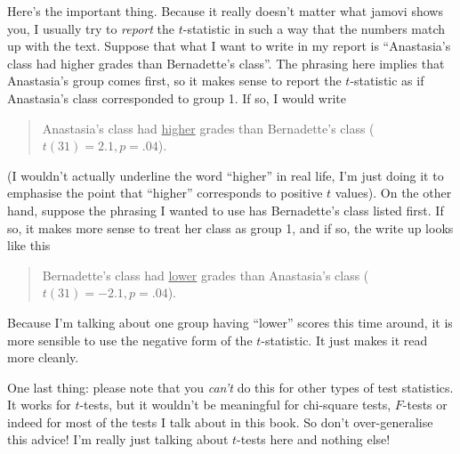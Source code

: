 Here's the important thing. Because it really doesn't matter what jamovi shows you, I usually try to {\it report} the $t$-statistic in such a way that the numbers match up with the text. Suppose that what I want to write in my report is ``Anastasia's class had higher  grades than Bernadette's class''. The phrasing here implies that Anastasia's group comes first, so it makes sense to report the $t$-statistic as if Anastasia's class corresponded to group 1. If so, I would write 
\begin{quote}
Anastasia's class had \underline{higher} grades than Bernadette's class ($t(31)= 2.1, p=.04$). 
\end{quote}
(I wouldn't actually underline the word ``higher'' in real life, I'm just doing it to emphasise the point that ``higher'' corresponds to positive $t$ values). On the other hand, suppose the phrasing I wanted to use has Bernadette's class listed first. If so, it makes more sense to treat her class as group 1, and if so, the write up looks like this
\begin{quote}
Bernadette's class had \underline{lower} grades than Anastasia's class ($t(31)= -2.1, p=.04$). 
\end{quote}
Because I'm talking about one group having ``lower'' scores this time around, it is more sensible to use the negative form of the $t$-statistic. It just makes it read more cleanly.

One last thing: please note that you {\it can't} do this for other types of test statistics. It works for $t$-tests, but it wouldn't be meaningful for chi-square tests, $F$-tests or indeed for most of the tests I talk about in this book. So don't over-generalise this advice! I'm really just talking about $t$-tests here and nothing else!
 

